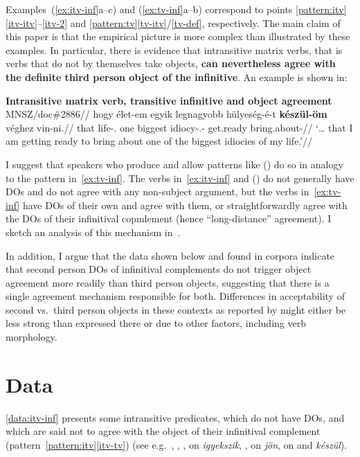 Examples~(\ref{ex:itv-inf}a--c) and (\ref{ex:tv-inf}a--b) correspond to points
\ref{pattern:itv}\ref{itv-itv}--\ref{itv-2} and
\ref{pattern:tv}\ref{tv-itv}/\ref{tv-def}, respectively. The main claim of this
paper is that the empirical picture is more complex than illustrated by these
examples. In particular, there is evidence that intransitive matrix verbs, that
is verbs that do not by themselves take \Acc{} objects, \textbf{can
nevertheless agree with the definite third person object of the infinitive}.
An example is shown in:

\ex \textbf{Intransitive matrix verb, transitive infinitive and object agreement}\\
    \begingl
        \glpreamble \gls{MNSZ}/doc\#2886//
        \gla 	\nogloss{\dots{}} hogy élet-em egyik legnagyobb hülyeség-é-t
        \textbf{készül-öm} {véghez vin-ni}.//
        \glb 	that life-\Fsg.\Poss{} one biggest
        idiocy-\Tsg.\Poss-\Acc{} get.ready bring.about-\Inf{}//
        \glft 	\enquote*{\dots{} that I am getting ready to bring about one
        of the biggest idiocies of my life.}//
    \endgl
\xe

I suggest that speakers who produce and allow patterns like (\lastx) do so in
analogy to the pattern in~\eqref{ex:tv-inf}. The verbs in~\eqref{ex:itv-inf}
and (\lastx) do not generally have \Acc{} \glspl{DO} and do not agree with any
non-subject argument, but the verbs in~\eqref{ex:tv-inf} have \Acc{} \glspl{DO}
of their own and agree with them, or straightforwardly agree with the
\glspl{DO} of their infinitival copmlement (hence \enquote{long-distance}
agreement). I sketch an analysis of this mechanism in~.

In addition, I argue that the data shown below and found in corpora indicate
that second person \glspl{DO} of infinitival complements do not trigger object
agreement more readily than third person objects, suggesting that there is a
single agreement mechanism responsible for both. Differences in acceptability
of second vs.\ third person objects in these contexts as reported by
\textcites[227]{EKiss1987}[54]{EKiss2002}[61]{KalmanCetal1989}[451]{denDikken2004}
might either be less strong than expressed there or due to other factors,
including verb morphology.

\section{Data}\label{sec:data}

\eqref{data:itv-inf} presents some intransitive predicates, which do not have
\Acc{} \glspl{DO}, and which are said not to agree with the \Acc{} object of
their infinitival complement (pattern~\ref{pattern:itv}\ref{itv-tv}) (see
e.g.~\citealt[226]{EKiss1987}, \citealt[54]{EKiss2002},
\citealt[60--61]{KalmanCetal1989}, \citealt[79]{SzeSze2018} on
\emph{igyekszik}, \citealt[61]{KalmanCetal1989}, \citealt[449,
451]{denDikken2004} on \emph{jön}, \citealt[79]{SzeSze2018} on and
\emph{készül}).

